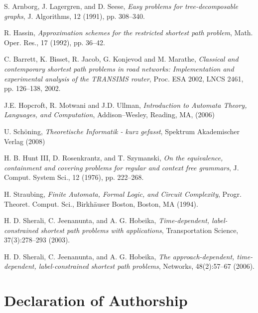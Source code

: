 \documentclass[]{article}
\numberwithin{equation}{section}
\begin{document}
\begin{thebibliography}{Lam00}
	S. Arnborg, J. Lagergren, and D. Seese,
	\emph{Easy problems for tree-decomposable graphs},
	J. Algorithms, 12 (1991), pp. 308–340.
	
	R. Hassin,
	\emph{Approximation schemes for the restricted shortest path problem},
	Math. Oper. Res., 17 (1992), pp. 36–42.
	
	C. Barrett, K. Bisset, R. Jacob, G. Konjevod and M. Marathe,
	\emph{Classical and contemporary shortest path problems in road networks: Implementation and experimental analysis of the TRANSIMS router},
	Proc. ESA 2002, LNCS 2461, pp. 126–138, 2002.
	
	J.E. Hopcroft, R. Motwani and J.D. Ullman,
	\emph{Introduction to Automata Theory, Languages, and Computation},
	Addison–Wesley, Reading, MA, (2006)
	
	U. Sch\"oning,
	\emph{Theoretische Informatik - kurz gefasst},
	Spektrum Akademischer Verlag (2008)
	
	H. B. Hunt III, D. Rosenkrantz, and T. Szymanski,
	\emph{On the equivalence, containment	and covering problems for regular and context free grammars},
	J. Comput. System Sci., 12 (1976), pp. 222–268.
	
	H. Straubing,
	\emph{Finite Automata, Formal Logic, and Circuit Complexity},
	Progr. Theoret.	Comput. Sci., Birkh\"auser Boston, Boston, MA (1994).
	
	H. D. Sherali, C. Jeenanunta, and A. G. Hobeika, \emph{Time-dependent, label-constrained shortest path problems with applications},
	Transportation Science,	37(3):278–293 (2003).
	
	H. D. Sherali, C. Jeenanunta, and A. G. Hobeika,
	\emph{The approach-dependent, time-dependent, label-constrained shortest path problems},
	Networks, 48(2):57–67 (2006).

	
\end{thebibliography}

\newpage

\pagestyle{empty}

\listoffigures

\listoftables

\newpage

\vspace*{8cm}


\section*{Declaration of Authorship}
\end{document}
